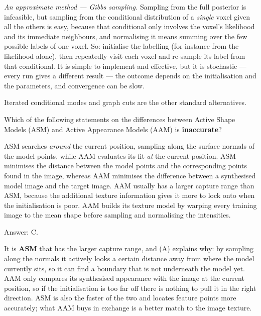 \documentclass[11pt]{exam}
\newcommand{\answerspace}[1]{\ifprintanswers\else\vspace{#1}\fi}
\begin{document}
\begin{questions}
\begin{solution}
  \emph{An approximate method --- Gibbs sampling.} Sampling from the full posterior is infeasible,
  but sampling from the conditional distribution of a \emph{single} voxel given all the others is
  easy, because that conditional only involves the voxel's likelihood and its immediate
  neighbours, and normalising it means summing over the few possible labels of one voxel. So:
  initialise the labelling (for instance from the likelihood alone), then repeatedly visit each
  voxel and re-sample its label from that conditional. It is simple to implement and effective, but
  it is stochastic --- every run gives a different result --- the outcome depends on the
  initialisation and the parameters, and convergence can be slow.

  Iterated conditional modes and graph cuts are the other standard alternatives.
\end{solution}
\answerspace{7.5cm}

\question
Which of the following statements on the differences between Active Shape Models (ASM) and Active
Appearance Models (AAM) is \textbf{inaccurate}?

\begin{choices}
  \choice ASM searches \emph{around} the current position, sampling along the surface normals of
  the model points, while AAM evaluates its fit \emph{at} the current position.
  \choice ASM minimises the distance between the model points and the corresponding points found
  in the image, whereas AAM minimises the difference between a synthesised model image and the
  target image.
  \choice AAM usually has a larger capture range than ASM, because the additional texture
  information gives it more to lock onto when the initialisation is poor.
  \choice AAM builds its texture model by warping every training image to the mean shape before
  sampling and normalising the intensities.
\end{choices}

\begin{solution}
  Answer: C.

  It is \textbf{ASM} that has the larger capture range, and (A) explains why: by sampling along the
  normals it actively looks a certain distance away from where the model currently sits, so it can
  find a boundary that is not underneath the model yet. AAM only compares its synthesised
  appearance with the image at the current position, so if the initialisation is too far off there
  is nothing to pull it in the right direction. ASM is also the faster of the two and locates
  feature points more accurately; what AAM buys in exchange is a better match to the image texture.
\end{solution}


\end{questions}
\end{document}

